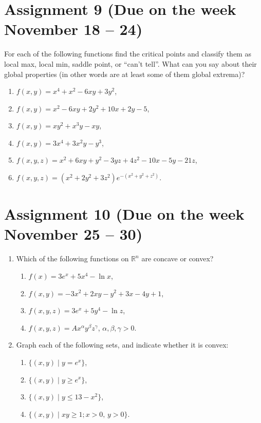 \documentclass[12pt]{article} %
\theoremstyle{definition} %
\begin{document}
\section{Assignment 9 (Due on the week November 18 – 24)}


For each of the following functions find the critical points and classify them as local max, local min, saddle point, or ``can't tell''. What can you say about their global properties (in other words are at least some of them global extrema)?

\begin{enumerate}
\item $f(x,y)=x^4+x^2-6xy+3y^2$,
\item $f(x,y)=x^2-6xy+2y^2+10x+2y-5$,
\item $f(x,y)=xy^2+x^3y-xy$,
\item $f(x,y)=3x^4+3x^2y-y^3$,
\item $f(x,y, z)=x^2+6xy+y^2-3yz+4z^2-10x-5y-21z$,
\item $f(x,y,z)=(x^2+2y^2+3z^2)e^{-(x^2+y^2+z^2)}$.
\end{enumerate}




\section{Assignment 10 (Due on the week November 25 – 30)}

\begin{enumerate}
\item Which of the following functions on $\mathbb{R}^n$ are concave or convex?
\begin{enumerate}
\item $f(x)=3e^x+5x^4-\ln x$,
\item $f(x, y)=-3x^2+2xy-y^2+3x-4y+1$,
\item $f(x,y,z)=3e^x+5y^4-\ln z$,
\item $f(x,y,z)=Ax^\alpha y^\beta z^\gamma$, $\alpha,\beta,\gamma>0$.
\end{enumerate}
\item Graph each of the following sets, and indicate whether it is convex:
\begin{enumerate}
\item $\{(x,y)\;|\; y=e^x\}$,
\item $\{(x,y)\;|\; y\geqslant e^x\}$,
\item $\{(x,y)\;|\;y\leqslant 13-x^2\}$,
\item $\{(x,y)\;|\; xy\geqslant 1; x>0,\, y>0\}$.
\end{enumerate}
\end{enumerate}
\end{document}

